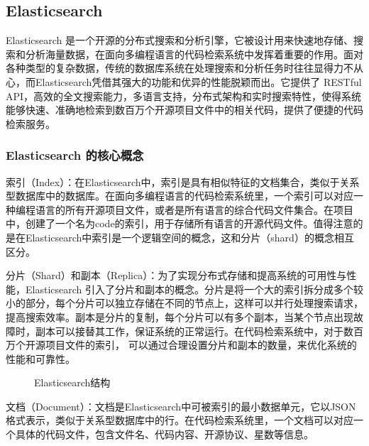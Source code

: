 \documentclass[UTF8,a4paper,12pt]{ctexart}
\numberwithin{equation}{section}
\begin{document}
\subsection{Elasticsearch}
Elasticsearch 是一个开源的分布式搜索和分析引擎，它被设计用来快速地存储、搜索和分析海量数据，在面向多编程语言的代码检索系统中发挥着重要的作用。面对各种类型的复杂数据，传统的数据库系统在处理搜索和分析任务时往往显得力不从心，而Elasticsearch凭借其强大的功能和优异的性能脱颖而出。它提供了 RESTful API，高效的全文搜索能力，多语言支持，分布式架构和实时搜索特性，使得系统能够快速、准确地检索到数百万个开源项目文件中的相关代码，提供了便捷的代码检索服务。
\subsubsection{Elasticsearch 的核心概念}
索引（Index）：在Elasticsearch中，索引是具有相似特征的文档集合，类似于关系型数据库中的数据库。在面向多编程语言的代码检索系统里，一个索引可以对应一种编程语言的所有开源项目文件，或者是所有语言的综合代码文件集合。在项目中，创建了一个名为code的索引，用于存储所有语言的开源代码文件。值得注意的是在Elasticsearch中索引是一个逻辑空间的概念，这和分片（shard）的概念相互区分。\par
分片（Shard）和副本（Replica）：为了实现分布式存储和提高系统的可用性与性能，Elasticsearch 引入了分片和副本的概念。分片是将一个大的索引拆分成多个较小的部分，每个分片可以独立存储在不同的节点上，这样可以并行处理搜索请求，提高搜索效率。副本是分片的复制，每个分片可以有多个副本，当某个节点出现故障时，副本可以接替其工作，保证系统的正常运行。在代码检索系统中，对于数百万个开源项目文件的索引，
可以通过合理设置分片和副本的数量，来优化系统的性能和可靠性。\par
\begin{figure}[H]
	\caption{Elasticsearch结构}
	\label{Elasticsearch}
\end{figure}
文档（Document）：文档是Elasticsearch中可被索引的最小数据单元，它以JSON格式表示，类似于关系型数据库中的行。在代码检索系统里，一个文档可以对应一个具体的代码文件，包含文件名、代码内容、开源协议、星数等信息。\par
\end{document}
